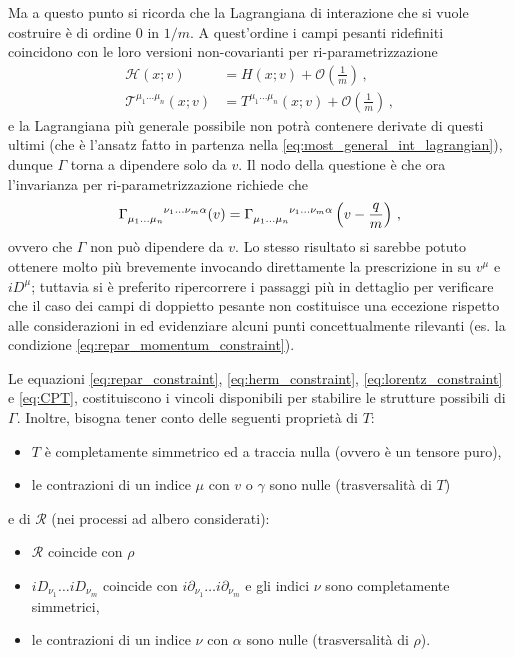 \documentclass{article}
\begin{document}
Ma a questo punto si ricorda che la Lagrangiana di interazione che si vuole costruire è di ordine $0$ in $1/m$. A quest'ordine i campi pesanti ridefiniti coincidono con le loro versioni non-covarianti per ri\hyp{}parametrizzazione
\begin{align}
  \mathcal{H}(x;v) &= H(x;v) + \mathcal{O}\left(\frac{1}{m}\right) \, , \\
  \mathcal{T}^{\mu_1 \dots \mu_n}(x;v) &= T^{\mu_1 \dots \mu_n}(x;v) + \mathcal{O}\left(\frac{1}{m}\right) \, , 
\end{align}
e la Lagrangiana più generale possibile non potrà contenere derivate di questi ultimi (che è l'ansatz fatto in partenza nella \eqref{eq:most_general_int_lagrangian}), dunque $\Gamma$ torna a dipendere solo da $v$. Il nodo della questione è che ora l'invarianza per ri\hyp{}parametrizzazione richiede che
\begin{equation}
  \Gamma\indices{_{\mu_1 \dots \mu_n}^{\nu_1 \dots \nu_m \alpha}}(v) = \Gamma\indices{_{\mu_1 \dots \mu_n}^{\nu_1 \dots \nu_m \alpha}}\left( v - \frac{q}{m} \right) \, , 
  \label{eq:repar_constraint}
\end{equation}
ovvero che $\Gamma$ non può dipendere da $v$. Lo stesso risultato si sarebbe potuto ottenere molto più brevemente invocando direttamente la prescrizione in \cite{article:Luke_Manohar} su $v^\mu$ e $ i D^\mu$; tuttavia si è preferito ripercorrere i passaggi più in dettaglio per verificare che il caso dei campi di doppietto pesante non costituisce una eccezione rispetto alle considerazioni in \cite{article:Luke_Manohar} ed evidenziare alcuni punti concettualmente rilevanti (es. la condizione \eqref{eq:repar_momentum_constraint}).

Le equazioni \eqref{eq:repar_constraint}, \eqref{eq:herm_constraint}, \eqref{eq:lorentz_constraint} e \eqref{eq:CPT}, costituiscono i vincoli disponibili per stabilire le strutture possibili di $\Gamma$. Inoltre, bisogna tener conto delle seguenti proprietà di $T$:
\begin{itemize}
  \item $T$ è completamente simmetrico ed a traccia nulla (ovvero è un tensore puro), 
  \item le contrazioni di un indice $\mu$ con $v$ o $\gamma$ sono nulle (trasversalità di $T$)
\end{itemize}
e di $\mathcal{R}$ (nei processi ad albero considerati):
\begin{itemize}
  \item $\mathcal{R}$ coincide con $\rho$
  \item $i D_{\nu_1} \dots i D_{\nu_m}$ coincide con $i \partial_{\nu_1} \dots i \partial_{\nu_m}$ e gli indici $\nu$ sono completamente simmetrici,
  \item le contrazioni di un indice $\nu$ con $\alpha$ sono nulle (trasversalità di $\rho$).
\end{itemize}
\end{document}
